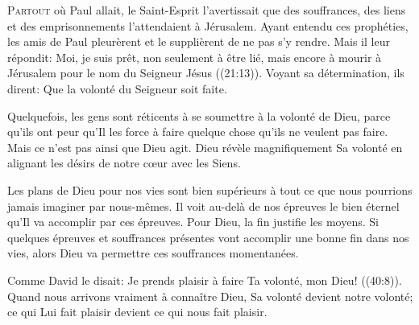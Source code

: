 



\lettrine{P}{artout} où Paul allait, le Saint-Esprit l'avertissait
 que des souffrances, des liens et des emprisonnements l'attendaient
 à Jérusalem. Ayant entendu ces prophéties, les amis de Paul pleurèrent
 et le supplièrent de ne pas s'y rendre. Mais il leur répondit:
 \Og Moi, je suis prêt, non seulement à être lié,
 mais encore à mourir à Jérusalem pour le nom du Seigneur Jésus \Fg{}
 ((21:13)). Voyant sa détermination, ils dirent: 
 \Og Que la volonté du Seigneur soit faite. \Fg{}


Quelquefois, les gens sont réticents à se soumettre à la volonté de Dieu,
 parce qu'ils ont peur qu'Il les force à faire quelque chose
 qu'ils ne veulent pas faire. Mais ce n'est pas ainsi que Dieu agit.
 Dieu révèle magnifiquement Sa volonté en alignant les désirs de notre
 c\oe{}ur avec les Siens.

Les plans de Dieu pour nos vies sont bien supérieurs à tout
 ce que nous pourrions jamais imaginer par nous-mêmes.
 Il voit au-delà de nos épreuves le bien éternel qu'Il va accomplir
 par ces épreuves. Pour Dieu, la fin justifie les moyens.
 Si quelques épreuves et souffrances présentes vont accomplir
 une bonne fin dans nos vies, alors Dieu va permettre
 ces souffrances momentanées.

Comme David le disait: 
 \Og Je prends plaisir à faire Ta volonté, mon Dieu! \Fg{}
 ((40:8)). Quand nous arrivons vraiment à connaître Dieu,
 Sa volonté devient notre volonté; ce qui Lui fait plaisir
 devient ce qui nous fait plaisir.

\dvrule



